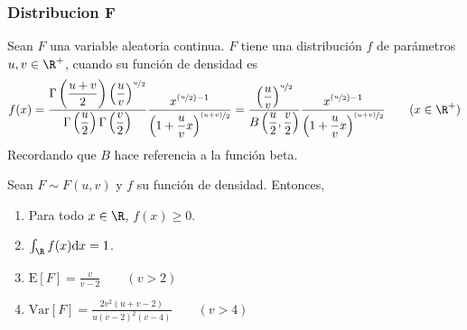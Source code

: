 \subsubsection{Distribucion F}

\begin{Def}
  Sean $F$ una variable aleatoria continua. $F$ tiene una distribución
  $f$ de parámetros $u,v\in\R^+$, cuando su función de densidad es
  \[f(x)=
  \dfrac{\Gamma\left(\frac{u+v}{2}\right)\left(\frac{u}{v}\right)^{\nicefrac{u}{2}}}
  {\Gamma\left(\frac{u}{2}\right)\Gamma\left(\frac{v}{2}\right)}
  \dfrac{x^{(\nicefrac{u}{2})-1}}
  {\left(1 + \frac{u}{v}x\right)^{\nicefrac{(u+v)}{2}}}
  =
  \dfrac{\left(\frac{u}{v}\right)^{\nicefrac{u}{2}}}
    {B\left(\frac{u}{2},\frac{v}{2}\right)}
  \dfrac{x^{(\nicefrac{u}{2})-1}}
    {\left(1 + \frac{u}{v}x\right)^{\nicefrac{(u+v)}{2}}}
  \qquad (x\in\R^+)
  \]
  Recordando que $B$ hace referencia a la función beta.
\end{Def}
\begin{Teo}
  Sean $F\sim F(u,v)$ y $f$ su función de densidad. Entonces,
  \begin{enumerate}
    \item Para todo $x\in\R$, $f(x) \geq 0$.
    \item $\int_{\R}f(x)\mathrm{d}x=1$.
    \item $\text{E}[F]=\frac{v}{v-2} \qquad(v>2)$
    \item $\text{Var}[F]=\frac{2v^2(u+v-2)}{u(v-2)^2(v-4)}\qquad(v>4)$
  \end{enumerate}
\end{Teo}
